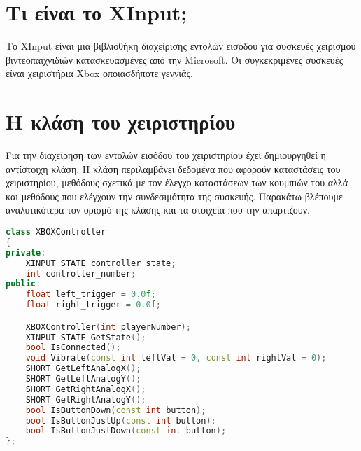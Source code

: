 



\section{Τι είναι το XInput;}
Το XInput είναι μια βιβλιοθήκη διαχείρισης εντολών εισόδου για
συσκευές χειρισμού βιντεοπαιχνιδιών κατασκευασμένες από την Microsoft.
Οι συγκεκριμένες συσκευές είναι χειριστήρια Xbox οποιασδήποτε γεννιάς.

\section{Η κλάση του χειριστηρίου}

Για την διαχείρηση των εντολών εισόδου του χειριστηρίου έχει δημιουργηθεί
η αντίστοιχη κλάση. Η κλάση περιλαμβάνει δεδομένα που αφορούν καταστάσεις
του χειριστηρίου, μεθόδους σχετικά με τον έλεγχο καταστάσεων των κουμπιών
του αλλά και μεθόδους που ελέγχουν την συνδεσιμότητα της συσκευής. Παρακάτω
βλέπουμε αναλυτικότερα τον ορισμό της κλάσης και τα στοιχεία που την απαρτίζουν.

\begin{lstlisting}[language=C++, style=cppstyle]
class XBOXController
{
private:
    XINPUT_STATE controller_state;
    int controller_number;
public:
    float left_trigger = 0.0f;
    float right_trigger = 0.0f;

    XBOXController(int playerNumber);
    XINPUT_STATE GetState();
    bool IsConnected();
    void Vibrate(const int leftVal = 0, const int rightVal = 0);
    SHORT GetLeftAnalogX();
    SHORT GetLeftAnalogY();
    SHORT GetRightAnalogX();
    SHORT GetRightAnalogY();
    bool IsButtonDown(const int button);
    bool IsButtonJustUp(const int button);
    bool IsButtonJustDown(const int button);
};
\end{lstlisting}





\begin{lstlisting}[language=C++, style=cppstyle]
\end{lstlisting}